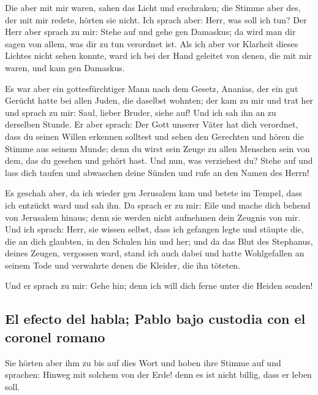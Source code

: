  Die aber mit mir waren, sahen das Licht und erschraken;
die Stimme aber des, der mit mir redete, hörten sie nicht.
 Ich sprach aber: Herr, was soll ich tun? Der Herr aber
sprach zu mir: Stehe auf und gehe gen Damaskus; da wird man dir sagen
von allem, was dir zu tun verordnet ist.  Als ich aber
vor Klarheit dieses Lichtes nicht sehen konnte, ward ich bei der Hand
geleitet von denen, die mit mir waren, und kam gen Damaskus.

 Es war aber ein gottesfürchtiger Mann nach dem Gesetz,
Ananias, der ein gut Gerücht hatte bei allen Juden, die daselbst
wohnten;  der kam zu mir und trat her und sprach zu mir:
Saul, lieber Bruder, siehe auf! Und ich sah ihn an zu derselben Stunde.
 Er aber sprach: Der Gott unserer Väter hat dich
verordnet, dass du seinen Willen erkennen solltest und sehen den
Gerechten und hören die Stimme aus seinem Munde;  denn du
wirst sein Zeuge zu allen Menschen sein von dem, das du gesehen und
gehört hast.  Und nun, was verziehest du? Stehe auf und
lass dich taufen und abwaschen deine Sünden und rufe an den Namen des
Herrn!

 Es geschah aber, da ich wieder gen Jerusalem kam und
betete im Tempel, dass ich entzückt ward und sah ihn.  Da
sprach er zu mir: Eile und mache dich behend von Jerusalem hinaus; denn
sie werden nicht aufnehmen dein Zeugnis von mir.  Und ich
sprach: Herr, sie wissen selbst, dass ich gefangen legte und stäupte
die, die an dich glaubten, in den Schulen hin und her; 
und da das Blut des Stephanus, deines Zeugen, vergossen ward, stand ich
auch dabei und hatte Wohlgefallen an seinem Tode und verwahrte denen die
Kleider, die ihn töteten.

 Und er sprach zu mir: Gehe hin; denn ich will dich ferne
unter die Heiden senden!

\hypertarget{el-efecto-del-habla-pablo-bajo-custodia-con-el-coronel-romano}{%
\subsection{El efecto del habla; Pablo bajo custodia con el coronel
romano}\label{el-efecto-del-habla-pablo-bajo-custodia-con-el-coronel-romano}}

 Sie hörten aber ihm zu bis auf dies Wort und hoben ihre
Stimme auf und sprachen: Hinweg mit solchem von der Erde! denn es ist
nicht billig, dass er leben soll.

